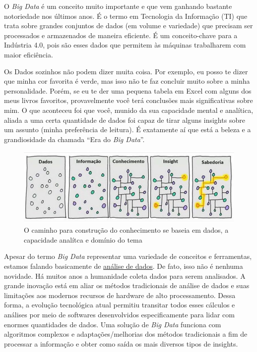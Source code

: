 \documentclass[
]{book}
\begin{document}
O \emph{Big Data} é um conceito muito importante e que vem ganhando bastante notoriedade nos últimos anos. É o termo em Tecnologia da Informação (TI) que trata sobre grandes conjuntos de dados (em volume e variedade) que precisam ser processados e armazenados de maneira eficiente. É um conceito-chave para a Indústria 4.0, pois são esses dados que permitem às máquinas trabalharem com maior eficiência.

Os Dados sozinhos não podem dizer muita coisa. Por exemplo, eu posso te dizer que minha cor favorita é verde, mas isso não te faz concluir muito sobre a minha personalidade. Porém, se eu te der uma pequena tabela em Excel com alguns dos meus livros favoritos, provavelmente você terá conclusões mais significativas sobre mim. O que aconteceu foi que você, munido da sua capacidade mental e analítica, aliada a uma certa quantidade de dados foi capaz de tirar alguns insights sobre um assunto (minha preferência de leitura). É exatamente aí que está a beleza e a grandiosidade da chamada ``Era do \emph{Big Data}''.

\begin{figure}

{\centering \includegraphics{dados_sabedoria} 

}

\caption{O caminho para construção do conhecimento se baseia em dados, a capacidade analítca e domínio do tema}\label{fig:unnamed-chunk-3}
\end{figure}

Apesar do termo \emph{Big Data} representar uma variedade de conceitos e ferramentas, estamos falando basicamente de \uline{análise de dados}. De fato, isso não é nenhuma novidade. Há muitos anos a humanidade coleta dados para serem analisados. A grande inovação está em aliar os métodos tradicionais de análise de dados e suas limitações aos modernos recursos de hardware de alto processamento. Dessa forma, a evolução tecnológica atual permitiu transitar todos esses cálculos e análises por meio de softwares desenvolvidos especificamente para lidar com enormes quantidades de dados. Uma solução de \emph{Big Data} funciona com algoritmos complexos e adaptações/melhorias dos métodos tradicionais a fim de processar a informação e obter como saída os mais diversos tipos de insights.
\end{document}
